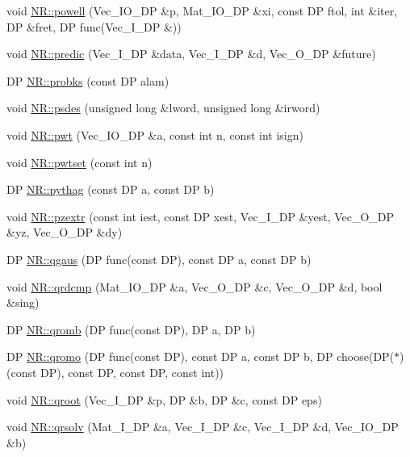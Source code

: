 \begin{DoxyCompactItemize}
void \mbox{\hyperlink{namespaceNR_a4fb8d09f0f222a20c3ff734627a5a760}{N\+R\+::powell}} (Vec\+\_\+\+I\+O\+\_\+\+DP \&p, Mat\+\_\+\+I\+O\+\_\+\+DP \&xi, const DP ftol, int \&iter, DP \&fret, DP func(Vec\+\_\+\+I\+\_\+\+DP \&))
\item 
void \mbox{\hyperlink{namespaceNR_a1e509a4abc2af770058b8ec1037f37ad}{N\+R\+::predic}} (Vec\+\_\+\+I\+\_\+\+DP \&data, Vec\+\_\+\+I\+\_\+\+DP \&d, Vec\+\_\+\+O\+\_\+\+DP \&future)
\item 
DP \mbox{\hyperlink{namespaceNR_a728a822ccbd90f47b7e83d9186ca631a}{N\+R\+::probks}} (const DP alam)
\item 
void \mbox{\hyperlink{namespaceNR_a2d127644657046b9b67b8189fd79d51c}{N\+R\+::psdes}} (unsigned long \&lword, unsigned long \&irword)
\item 
void \mbox{\hyperlink{namespaceNR_a6e01211469ec1a14c97e90b2bfaa8667}{N\+R\+::pwt}} (Vec\+\_\+\+I\+O\+\_\+\+DP \&a, const int n, const int isign)
\item 
void \mbox{\hyperlink{namespaceNR_afca49076efe7ccf7bf3d0512ba1c0117}{N\+R\+::pwtset}} (const int n)
\item 
DP \mbox{\hyperlink{namespaceNR_a4794ff6d4eaeeedd85a91698287cd7ac}{N\+R\+::pythag}} (const DP a, const DP b)
\item 
void \mbox{\hyperlink{namespaceNR_a583932239d9c539ae7d372295b01101a}{N\+R\+::pzextr}} (const int iest, const DP xest, Vec\+\_\+\+I\+\_\+\+DP \&yest, Vec\+\_\+\+O\+\_\+\+DP \&yz, Vec\+\_\+\+O\+\_\+\+DP \&dy)
\item 
DP \mbox{\hyperlink{namespaceNR_aea2857e7dfc20dc9c53694f04e7742c6}{N\+R\+::qgaus}} (DP func(const DP), const DP a, const DP b)
\item 
void \mbox{\hyperlink{namespaceNR_a4bfa0581b100fdc8f3bb1a5b8236e084}{N\+R\+::qrdcmp}} (Mat\+\_\+\+I\+O\+\_\+\+DP \&a, Vec\+\_\+\+O\+\_\+\+DP \&c, Vec\+\_\+\+O\+\_\+\+DP \&d, bool \&sing)
\item 
DP \mbox{\hyperlink{namespaceNR_a1d9dac2ce9ca89306257ab81b44473da}{N\+R\+::qromb}} (DP func(const DP), DP a, DP b)
\item 
DP \mbox{\hyperlink{namespaceNR_aba7cc6d489fecfde29b519f866c70676}{N\+R\+::qromo}} (DP func(const DP), const DP a, const DP b, DP choose(DP($\ast$)(const DP), const DP, const DP, const int))
\item 
void \mbox{\hyperlink{namespaceNR_afe717bad04398081c537d551740071ed}{N\+R\+::qroot}} (Vec\+\_\+\+I\+\_\+\+DP \&p, DP \&b, DP \&c, const DP eps)
\item 
void \mbox{\hyperlink{namespaceNR_a71ded3feeaea4e325e6e0d0a88c0e47f}{N\+R\+::qrsolv}} (Mat\+\_\+\+I\+\_\+\+DP \&a, Vec\+\_\+\+I\+\_\+\+DP \&c, Vec\+\_\+\+I\+\_\+\+DP \&d, Vec\+\_\+\+I\+O\+\_\+\+DP \&b)

\end{DoxyCompactItemize}
